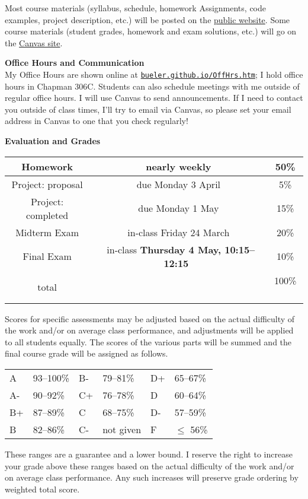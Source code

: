 \documentclass[12pt]{article}
\renewcommand{\emph}[1]{\textsf{\textbf{#1}}}
\newcommand{\localhead}[1]{\par\smallskip\textbf{#1} \smallskip\nobreak\\}%
\def\heading#1{\localhead{\large\emph{#1}}}
\begin{document}
Most course materials (syllabus, schedule, homework Assignments, code examples, project description, etc.) will be posted on the \href{https://bueler.github.io/nade/}{public website}.  Some course materials (student grades, homework and exam solutions, etc.) will go on the \href{https://canvas.alaska.edu/courses/13208}{Canvas site}.


\heading{Office Hours and Communication}
My Office Hours are shown online at \href{http://bueler.github.io/OffHrs.htm}{\texttt{bueler.github.io/OffHrs.htm}}; I hold office hours in Chapman 306C.  Students can also schedule meetings with me outside of regular office hours.  I will use Canvas to send announcements.  If I need to contact you outside of class times, I'll try to email via Canvas, so please set your email address in Canvas to one that you check regularly!

\medskip
\heading{Evaluation and Grades}
\vskip -10pt

\begin{tabular}{|c|c|c|}
\hline
Homework & nearly weekly & 50\% \\
\hline
Project: proposal & due Monday 3 April & 5\%  \\
\hline
Project: completed & due Monday 1 May & 15\%  \\
\hline
Midterm Exam & in-class Friday 24 March & 20\%  \\
\hline
Final Exam & \, in-class \emph{Thursday 4 May, 10:15--12:15} \, & 10\% \\
\hline
total & & 100\% \, \\
\hline
\end{tabular}

Scores for specific assessments may be adjusted based on the actual difficulty of the work and/or on average class performance, and adjustments will be applied to all students equally.  The scores of the various parts will be summed and the final course grade will be assigned as follows.

\begin{tabular}{llllll}
A  & 93--100\% & B- & 79--81\%  & D+ & 65--67\%  \\
A- & 90--92\%  & C+ & 76--78\%  & D  & 60--64\%  \\
B+ & 87--89\%  & C  & 68--75\%  & D- & 57--59\%  \\
B  & 82--86\%  & C- & not given & F  & $\le$ 56\%
\end{tabular}

These ranges are a guarantee and a lower bound.  I reserve the right to increase your grade above these ranges based on the actual difficulty of the work and/or on average class performance.  Any such increases will preserve grade ordering by weighted total score.
\end{document}
